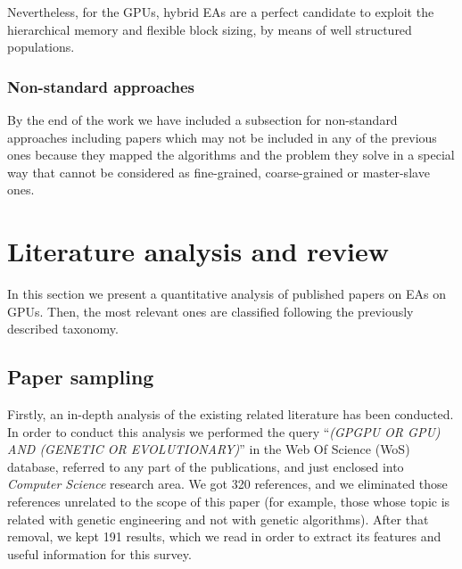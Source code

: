 \documentclass{article}
\begin{document}
Nevertheless, for the GPUs, hybrid EAs are a perfect candidate to exploit the hierarchical memory and flexible block sizing, by means of well structured populations. 


\subsubsection{Non-standard approaches}
By the end of the work we have included a subsection for non-standard
approaches \cite{DBLP:conf/gecco/PospichalMOSJ11} including papers
which may not be included in any of the previous ones because they
mapped the algorithms and the problem they solve in a special way that
cannot be considered as fine-grained, coarse-grained or master-slave
ones. 



\section{Literature analysis and review} 
\label{sec:survey}

In this section we present a quantitative analysis of published papers
on EAs on GPUs. Then, the most relevant ones are classified following
the previously described taxonomy. %

\subsection{Paper sampling} %

Firstly, an in-depth analysis of the existing related literature has been conducted. In order to conduct this analysis we performed the query ``\textit{(GPGPU OR GPU) AND (GENETIC OR EVOLUTIONARY)}'' in the Web Of Science (WoS) \cite{wos} database, referred to any part of the publications, and just enclosed into {\em Computer Science} research area. 
We got 320 references, and we eliminated those references unrelated to the scope of this paper (for example, those whose topic is related with genetic engineering and not with genetic algorithms). After that removal, we kept 191 results, which we read in order to extract its features and useful information for this survey.  %
\end{document}
